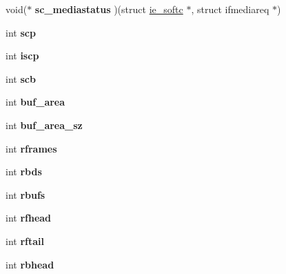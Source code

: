 \begin{DoxyCompactItemize}
\mbox{\label{structie__softc_a20d2e23a14eaa7012053a7f558e50304}} 
void($\ast$ {\bfseries sc\+\_\+mediastatus} )(struct \mbox{\hyperlink{structie__softc}{ie\+\_\+softc}} $\ast$, struct ifmediareq $\ast$)
\item 
\mbox{\label{structie__softc_a32dbfafc9158d84c3d16c612297daf57}} 
int {\bfseries scp}
\item 
\mbox{\label{structie__softc_a7bebf217f9c77da4da591fd95c9d0991}} 
int {\bfseries iscp}
\item 
\mbox{\label{structie__softc_a197ff2ae0b3fc4c32ff3cebce64852f4}} 
int {\bfseries scb}
\item 
\mbox{\label{structie__softc_ae58ebb7ee84ad80ee25fbf0161eecde7}} 
int {\bfseries buf\+\_\+area}
\item 
\mbox{\label{structie__softc_a86d2f5aa11d374dcbf7bea454db842ce}} 
int {\bfseries buf\+\_\+area\+\_\+sz}
\item 
\mbox{\label{structie__softc_accade40b07817bdcd2b97b1121012096}} 
int {\bfseries rframes}
\item 
\mbox{\label{structie__softc_abc5d58fd8ef43fb530c866a4b75453a1}} 
int {\bfseries rbds}
\item 
\mbox{\label{structie__softc_ab5d19993c86a8418bb20211120a35953}} 
int {\bfseries rbufs}
\item 
\mbox{\label{structie__softc_a74c82458543c58ac1dab40fba8296f13}} 
int {\bfseries rfhead}
\item 
\mbox{\label{structie__softc_a25958efed8f8013f4ef0ef3fc8d36073}} 
int {\bfseries rftail}
\item 
\mbox{\label{structie__softc_aa8985d77d17aeec1c80cd6a67a7761c5}} 
int {\bfseries rbhead}
\item 
\mbox{\label{structie__softc_ae1493696060e2e5d15f6d2cff7b379ea}} 

\end{DoxyCompactItemize}

